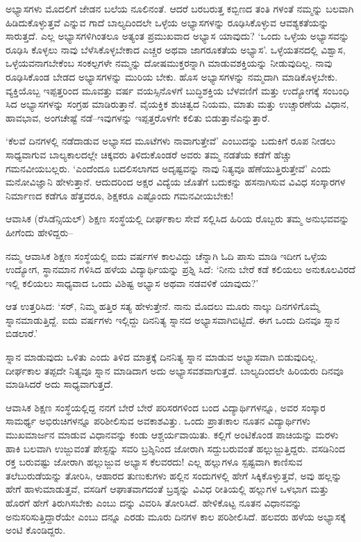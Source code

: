ಅಭ್ಯಾಸಗಳು ಮೊದಲಿಗೆ ಜೇಡನ ಬಲೆಯ ನೂಲಿನಂತೆ. ಆದರೆ ಬರಬರುತ್ತ ಕಬ್ಬಿಣದ ತಂತಿ ಗಳಂತೆ ನಮ್ಮನ್ನು ಬಲವಾಗಿ ಹಿಡಿದುಕೊಳ್ಳುತ್ತವೆ ಎನ್ನುವ ಗಾದೆ ಬಾಲ್ಯದಿಂದಲೇ ಒಳ್ಳೆಯ ಅಭ್ಯಾಸಗಳನ್ನು ರೂಢಿಸಿಕೊಳ್ಳುವ ಆವಶ್ಯಕತೆಯನ್ನು ಸಾರುತ್ತದೆ. ಎಲ್ಲ ಅಭ್ಯಾಸಗಳಿಗಿಂತಲೂ ಅತ್ಯಂತ ಪ್ರಮುಖವಾದ ಅಭ್ಯಾಸ ಯಾವುದು? ‘ಒಂದು ಒಳ್ಳೆಯ ಅಭ್ಯಾಸವನ್ನು ರೂಢಿಸಿ ಕೊಳ್ಳಲು ನಾವು ಬೆಳೆಸಿಕೊಳ್ಳಬೇಕಾದ ಎಚ್ಚರ ಅಥವಾ ಜಾಗರೂಕತೆಯ ಅಭ್ಯಾಸ’. ಒಳ್ಳೆಯತನದಲ್ಲಿ ವಿಶ್ವಾಸ, ಒಳ್ಳೆಯವನಾಗಬೇಕೆಂಬ ಸಂಕಲ್ಪಗಳೇ ನಮ್ಮನ್ನು ದೋಷಮುಕ್ತರನ್ನಾಗಿ ಮಾಡುವ\break ಶಕ್ತಿಯನ್ನು ನೀಡುವುದಿಲ್ಲ. ನಾವು ರೂಢಿಸಿಕೊಂಡ ಬೇಡದ ಅಭ್ಯಾಸಗಳನ್ನು ಮುರಿಯ ಬೇಕು. ಹೊಸ ಅಭ್ಯಾಸಗಳನ್ನು ನಮ್ಮದಾಗಿ ಮಾಡಿಕೊಳ್ಳಬೇಕು. ವ್ಯಕ್ತಿಯೊಬ್ಬ ಇಪ್ಪತ್ತರಿಂದ ಮೂವತ್ತು ವರ್ಷ ವಯಸ್ಸಿನೊಳಗೆ ಬುದ್ಧಿಶಕ್ತಿಯ ಬೆಳವಣಿಗೆ ಮತ್ತು ಉದ್ಯೋಗಕ್ಕೆ ಸಂಬಂಧಿ ಸಿದ ಅಭ್ಯಾಸಗಳನ್ನು ಸಂಗ್ರಹ ಮಾಡಿರುತ್ತಾನೆ. ವೈಯಕ್ತಿಕ ಶುಚಿತ್ವದ ನಿಯಮ, ಮಾತು ಮತ್ತು ಉಚ್ಚಾರಣೆಯ ವಿಧಾನ, ಹಾವಭಾವ, ಅಂಗಚೇಷ್ಟೆ ನಡೆ–ಇವುಗಳನ್ನು ಇಪ್ಪತ್ತರೊಳಗೇ ಕಲಿತು ಬಿಡುತ್ತಾನೆ\break ಎನ್ನುತ್ತಾರೆ.

‘ಕೆಲವೆ ದಿನಗಳಲ್ಲಿ ನಡೆದಾಡುವ ಅಭ್ಯಾಸದ ಮೂಟೆಗಳು ನಾವಾಗುತ್ತೇವೆ’ ಎಂಬುದನ್ನು ಬದುಕಿಗೆ ರೂಪ ನೀಡಲು ಸಾಧ್ಯವಾಗುವ ಬಾಲ್ಯಕಾಲದಲ್ಲೇ ಚಿಕ್ಕವರು ತಿಳಿದುಕೊಂಡರೆ ಅವರು ತಮ್ಮ ನಡತೆಯ ಕಡೆಗೆ ಹೆಚ್ಚು ಗಮನವೀಯಬಲ್ಲರು. ‘ಎಂದೆಂದೂ ಬದಲಿಸಲಾಗದ ಅದೃಷ್ಟವನ್ನು ನಾವು ನಿತ್ಯವೂ ಹೆಣೆಯುತ್ತಿರುತ್ತೇವೆ’ ಎಂದು ಮನೋವಿಜ್ಞಾನಿ ಹೇಳುತ್ತಾನೆ. ಆದುದರಿಂದ ಅಕ್ಷರ ವಿದ್ಯೆಯ ಜೊತೆಗೆ ಬದುಕನ್ನು ಹಸನಾಗಿಸುವ ವಿವಿಧ ಸಂಸ್ಕಾರಗಳ ನಿರ್ಮಾಣದ ಕಡೆಗೂ ಹೆತ್ತವರೂ, ಶಿಕ್ಷಕರೂ ಎಷ್ಟೊಂದು ಗಮನವೀಯಬೇಕು!

ಆವಾಸಿಕ (ರೆಸಿಡೆನ್ಸಿಯಲ್​) ಶಿಕ್ಷಣ ಸಂಸ್ಥೆಯಲ್ಲಿ ದೀರ್ಘಕಾಲ ಸೇವೆ ಸಲ್ಲಿಸಿದ ಹಿರಿಯ ರೊಬ್ಬರು ತಮ್ಮ ಅನುಭವವನ್ನು ಹೀಗೆಂದು ಹೇಳಿದ್ದರು–

ನಮ್ಮ ಆವಾಸಿಕ ಶಿಕ್ಷಣ ಸಂಸ್ಥೆಯಲ್ಲಿ ಐದು ವರ್ಷಗಳ ಕಾಲವಿದ್ದು ಚೆನ್ನಾಗಿ ಓದಿ ಪಾಸು ಮಾಡಿ ಇದೀಗ ಒಳ್ಳೆಯ ಉದ್ಯೋಗ, ಸ್ಥಾನಮಾನ ಗಳಿಸಿದ ಹಳೆಯ ವಿದ್ಯಾರ್ಥಿಯನ್ನು ಪ್ರಶ್ನಿ ಸಿದೆ: ‘ನೀನು ಬೇರೆ ಕಡೆ ಕಲಿಯಲು ಅನುಕೂಲವಿರದೆ ಇಲ್ಲಿ ಕಲಿಯಲು ಸಾಧ್ಯವಾದ ಒಂದು ವಿಶಿಷ್ಟ ಅಭ್ಯಾಸ ಅಥವಾ ನಡವಳಿಕೆ ಯಾವುದು?’

ಆತ ಉತ್ತರಿಸಿದ: ‘ಸರ್, ನಿಮ್ಮ ಹತ್ತಿರ ಸತ್ಯ ಹೇಳುತ್ತೇನೆ. ನಾನು ಮೊದಲು ಮೂರು ನಾಲ್ಕು ದಿನಗಳಿಗೊಮ್ಮೆ ಸ್ನಾನಮಾಡುತ್ತಿದ್ದೆ. ಐದು ವರ್ಷಗಳು ಇಲ್ಲಿದ್ದು ದಿನನಿತ್ಯ ಸ್ನಾನದ ಅಭ್ಯಾಸವಾಗಿಬಿಟ್ಟಿದೆ. ಈಗ ಒಂದು ದಿನವೂ ಸ್ನಾನ ಬಿಡಲಾರೆ.’

ಸ್ನಾನ ಮಾಡುವುದು ಒಳಿತು ಎಂದು ತಿಳಿದ ಮಾತ್ರಕ್ಕೆ ದಿನನಿತ್ಯ ಸ್ನಾನ ಮಾಡುವ ಅಭ್ಯಾಸ\-ವಾಗಿ ಬಿಡುವುದಿಲ್ಲ. ದೀರ್ಘಕಾಲ ತಪ್ಪದೇ ನಿತ್ಯವೂ ಸ್ನಾನ ಮಾಡಿದಾಗ ಅದು ಅಭ್ಯಾಸವಶವಾಗುತ್ತದೆ. ಬಾಲ್ಯದಿಂದಲೇ ಹಿರಿಯರು ದಿನವೂ ಮಾಡಿಸಿದರೆ ಅದು ಸಾಧ್ಯವಾಗುತ್ತದೆ.

ಆವಾಸಿಕ ಶಿಕ್ಷಣ ಸಂಸ್ಥೆಯಲ್ಲಿದ್ದ ನನಗೆ ಬೇರೆ ಬೇರೆ ಪರಿಸರಗಳಿಂದ ಬಂದ ವಿದ್ಯಾರ್ಥಿಗಳನ್ನೂ, ಅವರ ಸಂಸ್ಕಾರ ಸಾಮರ್ಥ್ಯ ಅಭಿರುಚಿಗಳನ್ನೂ ಪರಿಶೀಲಿಸುವ ಅವಕಾಶವಿತ್ತು. ಒಂದು ಪ್ರಾತಃಕಾಲ ನೂತನ ವಿದ್ಯಾರ್ಥಿಗಳು ಮುಖಮಾರ್ಜನ ಮಾಡುವ ವಿಧಾನವನ್ನು ಕಂಡು ಆಶ್ಚರ್ಯ\-ವಾಯಿತು. ಕಲ್ಲಿಗೆ ಅಂಟಿಕೊಂಡ ಪಾಚಿಯನ್ನು ಮರಳು ಹಾಕಿ ಬಲವಾಗಿ ಉಜ್ಜುವಂತೆ ಪೇಸ್ಟನ್ನು ಸವರಿ ಬ್ರಶ್ಶಿನಿಂದ ಜೋರಾಗಿ ಸದ್ದುಬರುವಂತೆ ಹಲ್ಲುಜ್ಜುತ್ತಿದ್ದರು. ವಸಡಿನಿಂದ ರಕ್ತ ಬರುವಷ್ಟು ಜೋರಾಗಿ ಹಲ್ಲುಜ್ಜುವ ಅಭ್ಯಾಸ ಕೆಲವರದು! ಎಲ್ಲ ಹಲ್ಲುಗಳೂ ಸ್ಪಷ್ಟವಾಗಿ ಕಾಣಿಸುವ ತಲೆಬುರುಡೆಯನ್ನು ತೋರಿಸಿ, ಆಹಾರದ ತುಣುಕುಗಳು ಹಲ್ಲಿನ ಸಂದುಗಳಲ್ಲಿ ಹೇಗೆ ಸಿಕ್ಕಿಕೊಳ್ಳುತ್ತವೆ, ಅವು ಹಲ್ಲನ್ನು ಹೇಗೆ ಹಾಳುಮಾಡುತ್ತವೆ, ವಸಡಿಗೆ ಆಘಾತವಾಗದಂತೆ ಬ್ರಶ್ಶನ್ನು ವಿವಿಧ ರೀತಿಯಲ್ಲಿ ಹಲ್ಲುಗಳ ಒಳಭಾಗ ಮತ್ತು ಹೊರಗೆ ಹೇಗೆ ತಿರುಗಿಸಬೇಕು ಎಂಬು ದನ್ನು ವಿವರಿಸಿ ತೋರಿಸಿದೆ. ಹೇಳಿಕೊಟ್ಟ ನೂತನ ವಿಧಾನವನ್ನು ಅನುಸರಿಸುತ್ತಿದ್ದಾರೆಯೇ ಎಂಬು ದನ್ನೂ ಎರಡು ಮೂರು ದಿನಗಳ ಕಾಲ ಪರಿಶೀಲಿಸಿದೆ. ಹಲವರು ಹಳೆಯ ಅಭ್ಯಾಸಕ್ಕೆ ಅಂಟಿ ಕೊಂಡಿದ್ದರು.

